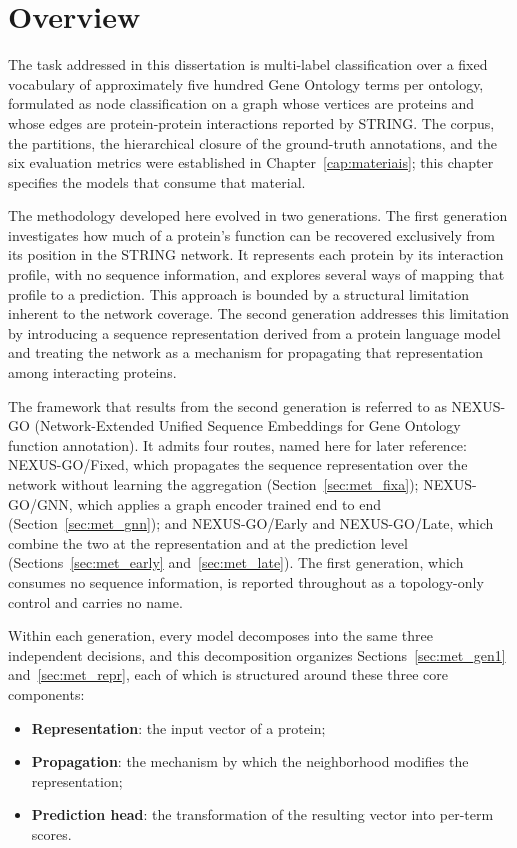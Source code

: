 \documentclass[Ingles]{ic-tese-v3}
\begin{document}
\section{Overview}
\label{sec:met_overview}

The task addressed in this dissertation is multi-label classification over a fixed vocabulary of
approximately five hundred Gene Ontology terms per ontology, formulated as node classification
on a graph whose vertices are proteins and whose edges are protein-protein
interactions reported by STRING. The corpus, the partitions, the hierarchical closure of the
ground-truth annotations, and the six evaluation metrics were established in
Chapter~\ref{cap:materiais}; this chapter specifies the models that consume that material.

The methodology developed here evolved in two generations. The first generation investigates
how much of a protein's function can be recovered exclusively from its position in the STRING
network. It represents each protein by its interaction profile, with no sequence
information, and explores several ways of mapping that profile to a prediction. This
approach is bounded by a structural limitation inherent to the network coverage. The second
generation addresses this limitation by introducing a sequence representation derived from a
protein language model and treating the network as a mechanism for propagating that
representation among interacting proteins.

The framework that results from the second generation is referred to as NEXUS-GO
(Network-Extended Unified Sequence Embeddings for Gene Ontology function annotation). It admits
four routes, named here for later reference: NEXUS-GO/Fixed, which propagates the sequence
representation over the network without learning the aggregation (Section~\ref{sec:met_fixa});
NEXUS-GO/GNN, which applies a graph encoder trained end to end (Section~\ref{sec:met_gnn}); and NEXUS-GO/Early and
NEXUS-GO/Late, which combine the two at the representation and at the prediction level
(Sections~\ref{sec:met_early} and~\ref{sec:met_late}). The first generation, which consumes no
sequence information, is reported throughout as a topology-only control and carries no name.

Within each generation, every model decomposes into the same three independent decisions, and this
decomposition organizes Sections~\ref{sec:met_gen1} and~\ref{sec:met_repr}, each of which is structured around these three core components:
\begin{itemize}
  \item \textbf{Representation}: the input vector of a protein;
  \item \textbf{Propagation}: the mechanism by which the neighborhood modifies the representation;
  \item \textbf{Prediction head}: the transformation of the resulting vector into per-term scores.
\end{itemize}
\end{document}
